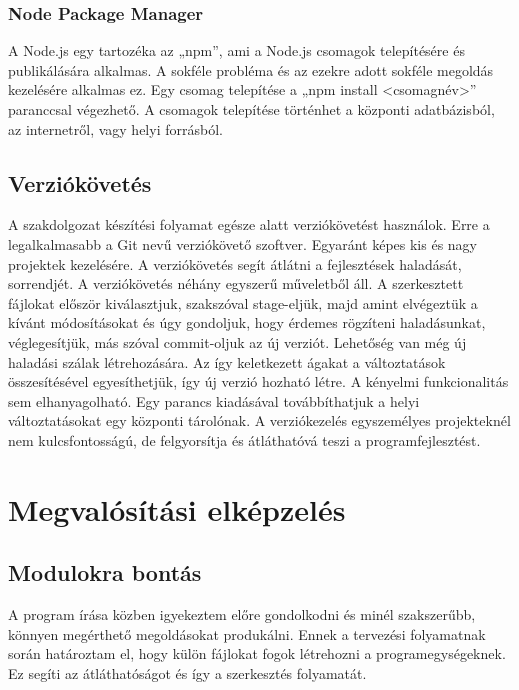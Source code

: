 \documentclass[bibliography=totocnumbered]{article}
\begin{document}
\subsubsection{Node Package Manager}

A Node.js egy tartozéka az „npm'', ami a Node.js csomagok telepítésére
és publikálására alkalmas. A sokféle probléma és az ezekre adott sokféle
megoldás kezelésére alkalmas ez. Egy csomag telepítése a „npm install
\textless{}csomagnév\textgreater{}'' paranccsal végezhető. A csomagok
telepítése történhet a központi adatbázisból, az internetről, vagy helyi
forrásból.


\subsection{Verziókövetés}

A szakdolgozat készítési folyamat egésze alatt verziókövetést használok.
Erre a legalkalmasabb a Git nevű verziókövető szoftver. Egyaránt képes
kis és nagy projektek kezelésére. A verziókövetés segít átlátni a
fejlesztések haladását, sorrendjét. A verziókövetés néhány egyszerű
műveletből áll. A szerkesztett fájlokat először kiválasztjuk, szakszóval
stage-eljük, majd amint elvégeztük a kívánt módosításokat és úgy
gondoljuk, hogy érdemes rögzíteni haladásunkat, véglegesítjük, más
szóval commit-oljuk az új verziót. Lehetőség van még új haladási szálak
létrehozására. Az így keletkezett ágakat a változtatások összesítésével
egyesíthetjük, így új verzió hozható létre. A kényelmi funkcionalitás
sem elhanyagolható. Egy parancs kiadásával továbbíthatjuk a helyi
változtatásokat egy központi tárolónak. A verziókezelés egyszemélyes
projekteknél nem kulcsfontosságú, de felgyorsítja és átláthatóvá teszi a
programfejlesztést.


\section{Megvalósítási
elképzelés}


\subsection{Modulokra bontás }

A program írása közben igyekeztem előre gondolkodni és minél
szakszerűbb, könnyen megérthető megoldásokat produkálni. Ennek a
tervezési folyamatnak során határoztam el, hogy külön fájlokat fogok
létrehozni a programegységeknek. Ez segíti az átláthatóságot és így a
szerkesztés folyamatát.
\end{document}
